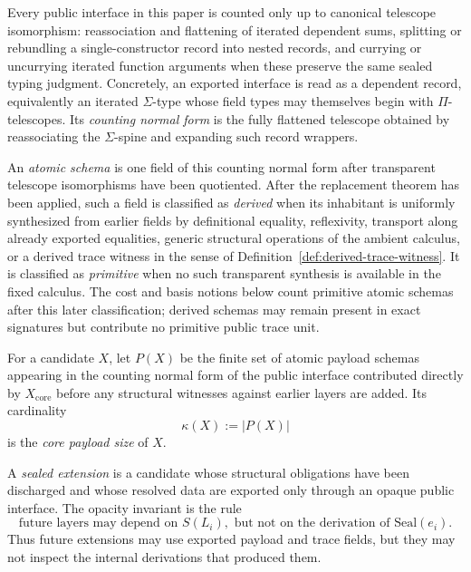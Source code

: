 \documentclass{lmcs}
\begin{document}
\begin{defi}
\label{def:counting-normal-form}
Every public interface in this paper is counted only up to canonical telescope isomorphism:
reassociation and flattening of iterated dependent sums, splitting or rebundling a
single-constructor record into nested records, and currying or uncurrying iterated function
arguments when these preserve the same sealed typing judgment.  Concretely, an exported
interface is read as a dependent record, equivalently an iterated \(\Sigma\)-type whose field
types may themselves begin with \(\Pi\)-telescopes.  Its \emph{counting normal form} is the
fully flattened telescope obtained by reassociating the \(\Sigma\)-spine and expanding such
record wrappers.

An \emph{atomic schema} is one field of this counting normal form after transparent
telescope isomorphisms have been quotiented.  After the replacement theorem has been
applied, such a field is classified as \emph{derived} when its inhabitant is uniformly
synthesized from earlier fields by definitional equality, reflexivity, transport along
already exported equalities, generic structural operations of the ambient calculus, or a
derived trace witness in the sense of Definition~\ref{def:derived-trace-witness}.  It is
classified as \emph{primitive} when no such transparent synthesis is available in the fixed
calculus.  The cost and basis notions below count primitive atomic schemas after this later
classification; derived schemas may remain present in exact signatures but contribute no
primitive public trace unit.
\end{defi}

\begin{defi}
For a candidate \(X\), let \(P(X)\) be the finite set of atomic payload schemas appearing in
the counting normal form of the public interface contributed directly by
\(X_{\mathrm{core}}\) before any structural witnesses against earlier layers are added.  Its
cardinality
\[
  \kappa(X) := |P(X)|
\]
is the \emph{core payload size} of \(X\).
\end{defi}

\begin{defi}
A \emph{sealed extension} is a candidate whose structural obligations have been discharged
and whose resolved data are exported only through an opaque public interface.  The opacity
invariant is the rule
\[
  \text{future layers may depend on } S(L_i),\text{ but not on the derivation of }\mathrm{Seal}(e_i).
\]
Thus future extensions may use exported payload and trace fields, but they may not inspect
the internal derivations that produced them.
\end{defi}
\end{document}
